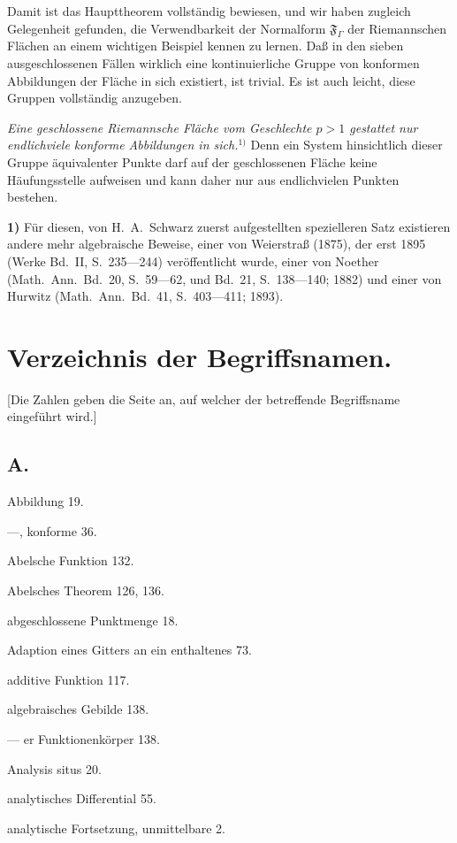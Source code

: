 \documentclass{article}
\begin{document}
Damit ist das Haupttheorem vollständig bewiesen, und wir haben zugleich Gelegenheit gefunden, die Verwendbarkeit der Normalform $\mathfrak{F}_\varGamma$ der Riemannschen Flächen an einem wichtigen Beispiel kennen zu lernen. Daß in den sieben ausgeschlossenen Fällen wirklich eine kontinuierliche Gruppe von konformen Abbildungen der Fläche in sich existiert, ist trivial. Es ist auch leicht, diese Gruppen vollständig anzugeben.

\emph{Eine geschlossene Riemannsche Fläche vom Geschlechte $p > 1$ gestattet nur endlichviele konforme Abbildungen in sich.}${}^{1)}$ Denn ein System hinsichtlich dieser Gruppe äquivalenter Punkte darf auf der geschlossenen Fläche keine Häufungsstelle aufweisen und kann daher nur aus endlichvielen Punkten bestehen.

\textbf{1)} Für diesen, von H.~A.~Schwarz zuerst aufgestellten spezielleren Satz existieren andere mehr algebraische Beweise, einer von Weierstraß (1875), der erst 1895 (Werke Bd.~II, S.~235---244) veröffentlicht wurde, einer von Noether (Math.\ Ann.\ Bd.~20, S.~59---62, und Bd.~21, S.~138---140; 1882) und einer von Hurwitz (Math.\ Ann.\ Bd.~41, S.~403---411; 1893).

\section*{Verzeichnis der Begriffsnamen.}

[Die Zahlen geben die Seite an, auf welcher der betreffende Begriffsname eingeführt wird.]

\subsection*{A.}

Abbildung 19.

---, konforme 36.

Abelsche Funktion 132.

Abelsches Theorem 126, 136.

abgeschlossene Punktmenge 18.

Adaption eines Gitters an ein enthaltenes 73.

additive Funktion 117.

algebraisches Gebilde 138.

--- er Funktionenkörper 138.

Analysis situs 20.

analytisches Differential 55.

analytische Fortsetzung, unmittelbare 2.
\end{document}

